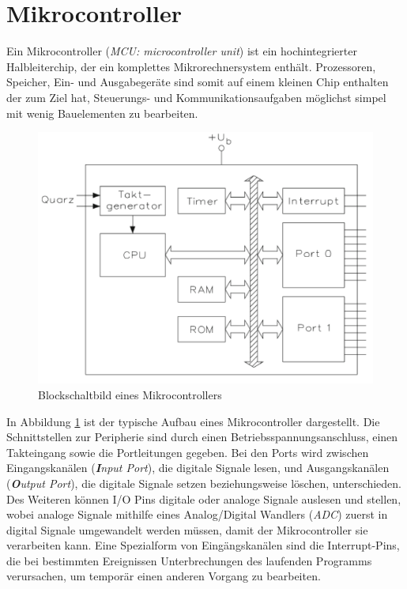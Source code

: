 \section{Mikrocontroller}
Ein Mikrocontroller (\textit{MCU: microcontroller unit}) ist ein hochintegrierter Halbleiterchip, der ein komplettes Mikrorechnersystem enthält. Prozessoren, Speicher, Ein- und Ausgabegeräte sind somit auf einem kleinen Chip enthalten der zum Ziel hat, Steuerungs- und Kommunikationsaufgaben möglichst simpel mit wenig Bauelementen zu bearbeiten. 
\begin{figure}[h]
	\centering
		\includegraphics{Bilder/BlockschaltbildMikrocontroller.pdf}
	\caption{Blockschaltbild eines Mikrocontrollers \cite[S.3]{Bernstein2015}}
	\label{fig:Blockschaltbild Mikrocontroller}
\end{figure}

In Abbildung \ref{fig:Blockschaltbild Mikrocontroller} ist der typische Aufbau eines Mikrocontroller dargestellt. Die Schnittstellen zur Peripherie sind durch einen Betriebsspannungsanschluss, einen Takteingang sowie die Portleitungen  gegeben. Bei den Ports wird zwischen Eingangskanälen (\textit{\textbf{I}nput Port}), die digitale Signale lesen, und Ausgangskanälen (\textit{\textbf{O}utput Port}), die digitale Signale setzen beziehungsweise löschen, unterschieden. Des Weiteren können I/O Pins digitale oder analoge Signale auslesen und stellen, wobei analoge Signale mithilfe eines Analog/Digital Wandlers (\textit{ADC}) zuerst in digital Signale umgewandelt werden müssen, damit der Mikrocontroller sie verarbeiten kann.
Eine Spezialform von Eingängskanälen sind die Interrupt-Pins, die bei bestimmten Ereignissen Unterbrechungen des laufenden Programms verursachen, um temporär einen anderen Vorgang zu bearbeiten. 


